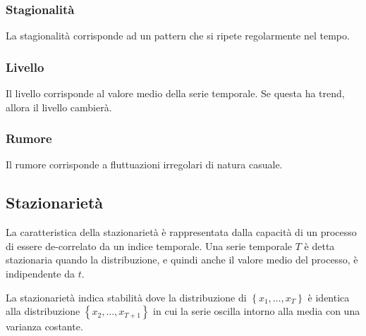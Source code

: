 \subsubsection{Stagionalità}
La stagionalità corrisponde ad un pattern che si ripete regolarmente nel tempo.

\subsubsection{Livello}
Il livello corrisponde al valore medio della serie temporale. Se questa ha trend, allora il livello cambierà.

\subsubsection{Rumore}
Il rumore corrisponde a fluttuazioni irregolari di natura casuale.

\subsection{Stazionarietà}
La caratteristica della stazionarietà è rappresentata dalla capacità di un processo di essere de-correlato da un indice temporale. Una serie temporale $T$ è detta stazionaria quando la distribuzione, e quindi anche il valore medio del processo, è indipendente da $t$. 

La stazionarietà indica stabilità dove la distribuzione di $\left\{ x_1, \ldots, x_T  \right\}$ è identica alla distribuzione $\left\{ x_2, \ldots, x_{T+1}  \right\}$ in cui la serie oscilla intorno alla media con una varianza costante.